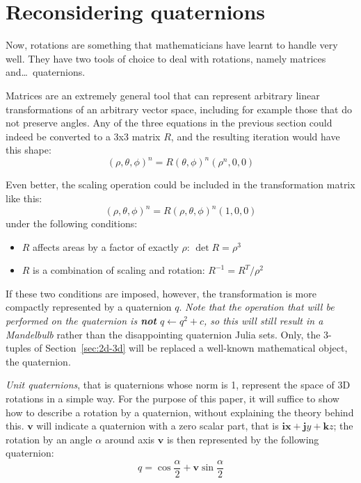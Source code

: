 \documentclass{article}
\let\vec\mathbf
\begin{document}
\section{Reconsidering quaternions}

Now, rotations are something that mathematicians have learnt to handle
very well.  They have two tools of choice to deal with rotations, namely
matrices and\dots\ quaternions.

Matrices are an extremely general tool that can represent arbitrary
linear transformations of an arbitrary vector space, including for
example those that do not preserve angles.  Any of the three equations
in the previous section could indeed be converted to a 3x3 matrix $R$,
and the resulting iteration would have this shape:
\begin{equation*}
  (\rho,\theta,\phi)^n = R(\theta,\phi)^n (\rho^n,0,0)
\end{equation*}

\noindent
Even better, the scaling operation could be included in the transformation
matrix like this:
\begin{equation*}
  (\rho,\theta,\phi)^n = R(\rho,\theta,\phi)^n (1,0,0)
\end{equation*}
\noindent
under the following conditions:
\begin{itemize}
\item $R$ affects areas by a factor of exactly $\rho$: $\det R = \rho^3$
\item $R$ is a combination of scaling and rotation: $R^{-1} = R^T / \rho^2$
\end{itemize}

If these two conditions are imposed, however, the transformation is
more compactly represented by a quaternion $q$.  \emph{Note that the
  operation that will be performed on the quaternion is \textbf{not}
  $q\leftarrow q^2+c$, so this will still result in a Mandelbulb}
rather than the disappointing quaternion Julia sets.  Only, the
3-tuples of Section~\ref{sec:2d-3d} will be replaced a well-known
mathematical object, the quaternion.

\emph{Unit quaternions}, that is quaternions whose norm is 1, represent
the space of 3D rotations in a simple way.  For the purpose of this paper,
it will suffice to show how to describe a rotation by a quaternion,
without explaining the theory behind this.  $\vec{v}$ will indicate a
quaternion with a zero scalar part, that is $\vec{ix}+\vec{j}y+\vec{k}z$;
the rotation by an angle $\alpha$ around axis $\vec{v}$ is then
represented by the following quaternion:
\begin{equation*}
q = \cos \frac\alpha2 + \vec{v} \sin \frac\alpha2
\end{equation*}
\end{document}
